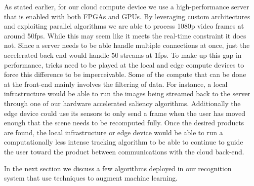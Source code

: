 As stated earlier, for our cloud compute device we use a high-performance server that is enabled with both FPGAs and GPUs. 
By leveraging custom architectures and exploiting parallel algorithms we are able to process 1080p video frames at around 50fps. 
While this may seem like it meets the real-time constraint it does not. Since a server needs to be able handle multiple connections at once, 
just the accelerated back-end would handle 50 streams at 1fps. To make up this gap in performance, 
tricks need to be played at the local and edge compute devices to force this difference to be imperceivable. 
Some of the compute that can be done at the front-end mainly involves the filtering of data. For instance, a local infrastructure would be able to run the 
images being streamed back to the server through one of our hardware accelerated saliency algorithms. Additionally the edge device 
could use its sensors to only send a frame when the user has moved enough that the scene needs to be recomputed fully. 
Once the desired products are found, the local infrastructure or edge device would be able to run a computationally less intense tracking 
algorithm to be able to continue to guide the user toward the product between communications with the cloud back-end.

In the next section we discuss a few algorithms deployed in our recognition system that use techniques to augment machine learning. 

